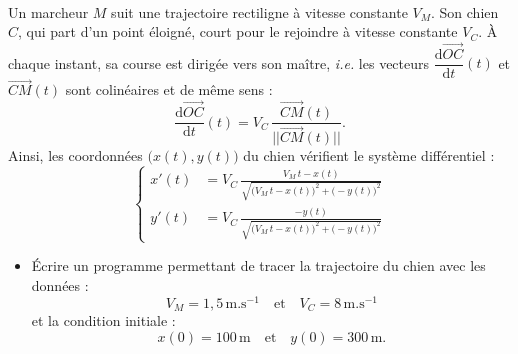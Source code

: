 \setcounter{numques}{0}~\\

Un marcheur $M$ suit une trajectoire rectiligne à vitesse constante $V_M$. Son chien $C$, qui part d'un point éloigné, court pour le rejoindre à vitesse constante $V_C$. \`{A} chaque instant, sa course est dirigée vers son maître, \textit{i.e.} les vecteurs $\dfrac{\text{d}\overrightarrow{OC}}{\text{d}t}(t)$ et $\overrightarrow{CM}(t)$ sont colinéaires et de même sens :
\[ \dfrac{\text{d}\overrightarrow{OC}}{\text{d}t}(t)=V_C\,\frac{\overrightarrow{CM}(t)}{\vert\vert\overrightarrow{CM}(t)\vert\vert}. \]
Ainsi, les coordonnées $\big(x(t),y(t)\big)$ du chien vérifient le système différentiel :
\[ \left\{ \begin{aligned} x'(t)&=V_C\,\frac{V_M\,t-x(t)}{\sqrt{\big( V_M\,t-x(t) \big)^2+\big( -y(t) \big)^2}} \\ y'(t)&=V_C\,\frac{-y(t)}{\sqrt{\big( V_M\,t-x(t) \big)^2+\big( -y(t) \big)^2}} \end{aligned} \right. \]
\begin{itemize}
	\item[\textbullet] \'{E}crire un programme permettant de tracer la trajectoire du chien avec les données :
		\[ V_M=1{,}5\,\text{m}.\text{s}^{-1} \quad \text{et} \quad V_C=8\,\text{m}.\text{s}^{-1} \]
		et la condition initiale :
		\[ x(0)=100\,\text{m} \quad \text{et} \quad y(0)=300\,\text{m}. \]
\end{itemize}